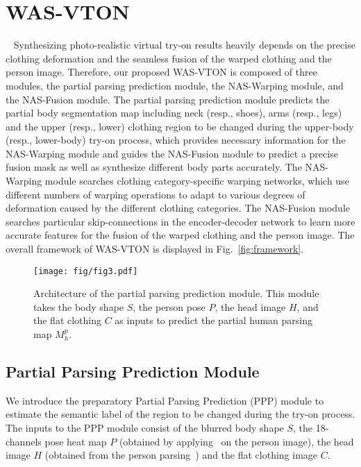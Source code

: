 \documentclass[sigconf]{acmart}
\begin{document}
\section{WAS-VTON}~\label{tab:method}
Synthesizing photo-realistic virtual try-on results heavily depends on the precise clothing deformation and the seamless fusion of the warped clothing and the person image.
Therefore, our proposed WAS-VTON is composed of three modules, the partial parsing prediction module, the NAS-Warping module, and the NAS-Fusion module. 
The partial parsing prediction module predicts the partial body segmentation map including neck (resp., shoes), arms (resp., legs) and the upper (resp., lower) clothing region to be changed during the upper-body (resp., lower-body) try-on process, which provides necessary information for the NAS-Warping module and guides the NAS-Fusion module to predict a precise fusion mask as well as synthesize different body parts accurately. 
The NAS-Warping module searches clothing category-specific warping networks, which use different numbers of warping operations to adapt to various degrees of deformation caused by the different clothing categories.
The NAS-Fusion module searches particular skip-connections in the encoder-decoder network to learn more accurate features for the fusion of the warped clothing and the person image. 
The overall framework of WAS-VTON is displayed in Fig.~\ref{fig:framework}.

\begin{figure}[t]
  \centering
  \texttt{[image: fig/fig3.pdf]}
  \vspace{-6mm}
  \caption{Architecture of the partial parsing prediction module. This module takes the body shape $S$, the person pose $P$, the head image $H$, and the flat clothing $C$ as inputs to predict the partial human parsing map $M_{h}^{p}$.}
  \vspace{-4mm}
  \label{fig:parsing_framework}
\end{figure}

\subsection{Partial Parsing Prediction Module}\label{parsing-predict}
We introduce the preparatory Partial Parsing Prediction (PPP) module to estimate the semantic label of the region to be changed during the try-on process.
The inputs to the PPP module consist of the blurred body shape $S$, the 18-channels pose heat map $P$ (obtained by applying~\cite{openpose} on the person image), the head image $H$ (obtained from the person parsing~\cite{Gong_2019_CVPR}) and the flat clothing image $C$.
\end{document}
